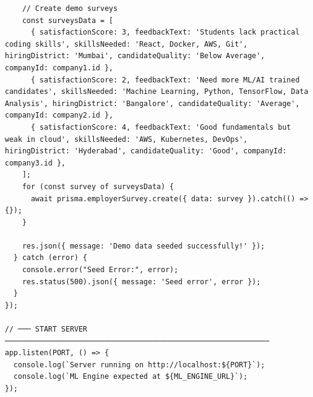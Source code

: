 \documentclass[12pt,a4paper]{report}
\begin{document}
\begin{verbatim}
    // Create demo surveys
    const surveysData = [
      { satisfactionScore: 3, feedbackText: 'Students lack practical coding skills', skillsNeeded: 'React, Docker, AWS, Git', hiringDistrict: 'Mumbai', candidateQuality: 'Below Average', companyId: company1.id },
      { satisfactionScore: 2, feedbackText: 'Need more ML/AI trained candidates', skillsNeeded: 'Machine Learning, Python, TensorFlow, Data Analysis', hiringDistrict: 'Bangalore', candidateQuality: 'Average', companyId: company2.id },
      { satisfactionScore: 4, feedbackText: 'Good fundamentals but weak in cloud', skillsNeeded: 'AWS, Kubernetes, DevOps', hiringDistrict: 'Hyderabad', candidateQuality: 'Good', companyId: company3.id },
    ];
    for (const survey of surveysData) {
      await prisma.employerSurvey.create({ data: survey }).catch(() => {});
    }

    res.json({ message: 'Demo data seeded successfully!' });
  } catch (error) {
    console.error("Seed Error:", error);
    res.status(500).json({ message: 'Seed error', error });
  }
});

// ─── START SERVER ─────────────────────────────────────────────────────────────
app.listen(PORT, () => {
  console.log(`Server running on http://localhost:${PORT}`);
  console.log(`ML Engine expected at ${ML_ENGINE_URL}`);
});

\end{verbatim}
\end{document}
